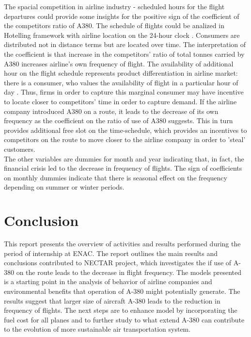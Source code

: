 \documentclass[titlepage, 11pt]{article}
\begin{document}
The spacial competition in airline industry - scheduled hours for the flight departures could provide some insights for the positive sign of the coefficient of the competitors ratio of A380. The schedule of flights could be analized in Hotelling framework with airline location on the 24-hour clock \cite{hotelling}. Consumers are distributed not in distance terms but are located over time. The interpretation of the coefficient is that increase in the competitors' ratio of total tonnes carried by A380 increases airline's own frequency of flight. The availability of additional hour on the flight schedule represents product differentiation in airline market: there is a consumer, who values the availability of flight in a particular hour of day \cite{hotelling}. Thus, firms in order to capture this marginal consumer may have incentive to locate closer to competitors' time in order to capture demand. If the airline company introduced A380 on a route, it leads to the decrease of its own frequency as the coefficient on the ratio of use of A380 suggests. This in turn provides additional free slot on the time-schedule, which provides an incentives to competitors on the route to move closer to the airline company in order to 'steal' customers. 
\\
\tab The other variables are dummies for month and year indicating that, in fact, the financial crisis led to the decrease in frequency of flights. The sign of coefficients on monthly dummies indicate that there is seasonal effect on the frequency depending on summer or winter periods. 
\section{Conclusion}\label{conclusion}
\tab This report presents the overview of activities and results performed during the period of internship at ENAC. The report outlines the main results and conclusions contributed to NECTAR project, which investigates the if use of A-380 on the route leads to the decrease in flight frequency. The models presented is a starting point in the analysis of behavior of airline companies and environmental benefits that operation of A-380 might potentially generate. The results suggest that larger size of aircraft A-380 leads to the reduction in frequency of flights. The next steps are to enhance model by incorporating the fuel cost for all planes and to further study to what extend A-380 can contribute to the evolution of more sustainable air transportation system. 
 
\end{document}
